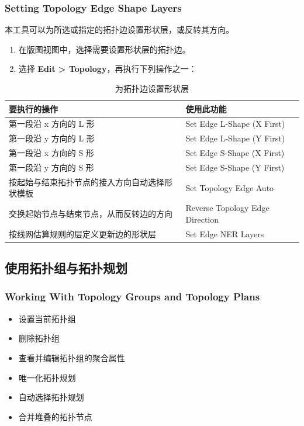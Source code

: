 \subsubsection*{Setting Topology Edge Shape Layers}

本工具可以为所选或指定的拓扑边设置形状层，或反转其方向。
\begin{enumerate}
  \item 在版图视图中，选择需要设置形状层的拓扑边。
  \item 选择 \textbf{Edit > Topology}，再执行下列操作之一：
\end{enumerate}

\begin{table}[htbp]
\centering
\caption{为拓扑边设置形状层}
\label{tab:gui-dp-shapelayer}
\begin{tabularx}{\textwidth}{@{}X l@{}}
\toprule
要执行的操作 & 使用此功能 \\
\midrule
第一段沿 x 方向的 L 形 & Set Edge L-Shape (X First) \\
第一段沿 y 方向的 L 形 & Set Edge L-Shape (Y First) \\
第一段沿 x 方向的 S 形 & Set Edge S-Shape (X First) \\
第一段沿 y 方向的 S 形 & Set Edge S-Shape (Y First) \\
按起始与结束拓扑节点的接入方向自动选择形状模板 & Set Topology Edge Auto \\
交换起始节点与结束节点，从而反转边的方向 & Reverse Topology Edge Direction \\
按线网估算规则的层定义更新边的形状层 & Set Edge NER Layers \\
\bottomrule
\end{tabularx}
\end{table}

\subsection{使用拓扑组与拓扑规划}
\subsubsection*{Working With Topology Groups and Topology Plans}

\begin{itemize}
  \item 设置当前拓扑组
  \item 删除拓扑组
  \item 查看并编辑拓扑组的聚合属性
  \item 唯一化拓扑规划
  \item 自动选择拓扑规划
  \item 合并堆叠的拓扑节点
\end{itemize}

